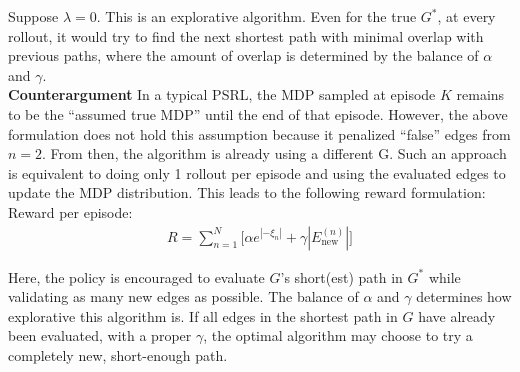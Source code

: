 \documentclass[10pt]{article}
\begin{document}
\noindent Suppose $\lambda=0$. This is an explorative algorithm. Even for the true $G^*$, at every rollout, it would try to find the next shortest path with minimal overlap with previous paths, where the amount of overlap is determined by the balance of $\alpha$ and $\gamma$.\\

\noindent\textbf{Counterargument} In a typical PSRL, the MDP sampled at episode $K$ remains to be the ``assumed true MDP'' until the end of that episode. However, the above formulation does not hold this assumption because it penalized ``false'' edges from $n=2$. From then, the algorithm is already using a different G. Such an approach is equivalent to doing only 1 rollout per episode and using the evaluated edges to update the MDP distribution. This leads to the following reward formulation:\\


\noindent Reward per episode:
\begin{align*}
R = \sum_{n=1}^N \bigg[\alpha e^{|-\xi_n|} + \gamma |E_\text{new}^{(n)}|\bigg]
\end{align*}

\noindent Here, the policy is encouraged to evaluate $G$'s short(est) path in $G^*$ while validating as many new edges as possible. The balance of $\alpha$ and $\gamma$ determines how explorative this algorithm is. If all edges in the shortest path in $G$ have already been evaluated, with a proper $\gamma$, the optimal algorithm may choose to try a completely new, short-enough path.
\end{document}
